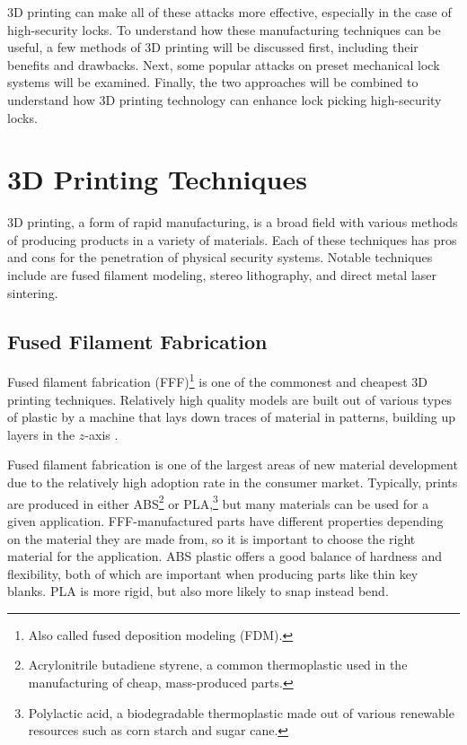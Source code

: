 \documentclass{acm_proc_article-sp}
\begin{document}
3D printing can make all of these attacks more effective, especially in the case of high-security locks. To understand how these manufacturing techniques can be useful, a few methods of 3D printing will be discussed first, including their benefits and drawbacks. Next, some popular attacks on preset mechanical lock systems will be examined. Finally, the two approaches will be combined to understand how 3D printing technology can enhance lock picking high-security locks.

\section{3D Printing Techniques}
3D printing, a form of rapid manufacturing, is a broad field with various methods of producing products in a variety of materials. Each of these techniques has pros and cons for the penetration of physical security systems. Notable techniques include are fused filament modeling, stereo lithography, and direct metal laser sintering.

\subsection{Fused Filament Fabrication}
Fused filament fabrication (FFF)\footnote{Also called fused deposition modeling (FDM).} is one of the commonest and cheapest 3D printing techniques. Relatively high quality models are built out of various types of plastic by a machine that lays down traces of material in patterns, building up layers in the $z$-axis \cite{VALAVAARA}.

Fused filament fabrication is one of the largest areas of new material development due to the relatively high adoption rate in the consumer market. Typically, prints are produced in either ABS\footnote{Acrylonitrile butadiene styrene, a common thermoplastic used in the manufacturing of cheap, mass-produced parts.} or PLA,\footnote{Polylactic acid, a biodegradable thermoplastic made out of various renewable resources such as corn starch and sugar cane.} but many materials can be used for a given application. FFF-manufactured parts have different properties depending on the material they are made from, so it is important to choose the right material for the application. ABS plastic offers a good balance of hardness and flexibility, both of which are important when producing parts like thin key blanks. PLA is more rigid, but also more likely to snap instead bend.
\end{document}
